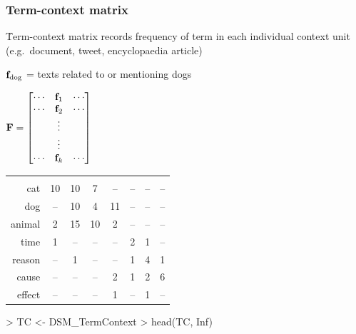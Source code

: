 \documentclass[t]{beamer} %
\begin{document}
\begin{frame}[fragile]
  \frametitle{Term-context matrix}

  \h{Term-context matrix} records frequency of term in each individual context unit (e.g.\ document, tweet, encyclopaedia article)
  \begin{itemize}
    \itemhand $\vf_{\text{dog}}$ = texts related to or mentioning dogs
  \end{itemize}
  
  \gap[0.5]
  \begin{center}
  \(
  \mathbf{F} = 
  \begin{bmatrix}
    \cdots & \vf_1 & \cdots \\
    \cdots & \vf_2 & \cdots \\
    & \vdots & \\
    & \vdots & \\
    \cdots & \vf_k & \cdots \\
  \end{bmatrix}
  \)
  \hspace{5mm}
  \begin{small}
    \setlength{\arrayrulewidth}{1pt}
    \begin{tabular}[c]{r*{7}{|c}|}
      & 
      & 
      & 
      & 
      & 
      & 
      &  \\
      cat      &      10 &  10 &     7 &    -- &         -- &   -- &        -- \\
      dog      &      -- &  10 &     4 &    11 &         -- &   -- &        -- \\
      animal   &       2 &  15 &    10 &     2 &         -- &   -- &        -- \\
      time     &       1 &  -- &    -- &    -- &          2 &    1 &        -- \\
      reason   &      -- &   1 &    -- &    -- &          1 &    4 &         1 \\
      cause    &      -- &  -- &    -- &     2 &          1 &    2 &         6 \\
      effect   &      -- &  -- &    -- &     1 &         -- &    1 &        -- \\
    \end{tabular}
  \end{small}
  \end{center}

\begin{Rcode}
> TC <- DSM_TermContext
> head(TC, Inf)
\end{Rcode}
\end{frame}
\end{document}
